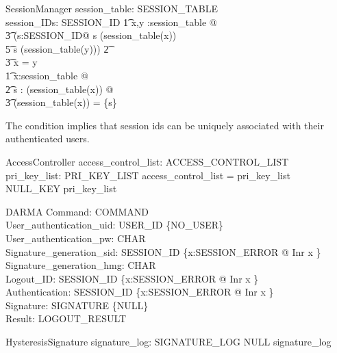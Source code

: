 \documentclass[a4paper,pdftex]{article}
\begin{document}
\begin{schema}{SessionManager}
  session\_table: SESSION\_TABLE \\
  session\_IDs: \finset SESSION\_ID
  \where
  \t1 \forall x,y :\dom session\_table @         \\
  \t3  (\exists s:SESSION\_ID@ s \in \dom (session\_table(x)) \\
  \t5                          \land s \in \dom (session\_table(y))) 
  \t2  \implies  \\
  \t3   x = y\\
  \t1 \forall  x:\dom session\_table @ \\
  \t2   \forall s : \dom (session\_table(x)) @ \\
  \t3               \dom (session\_table(x)) = \{s\}
\end{schema}

The condition implies that session ids can be uniquely associated with their
authenticated users.

\begin{schema}{AccessController}
  access\_control\_list: ACCESS\_CONTROL\_LIST \\
  pri\_key\_list: PRI\_KEY\_LIST
  \where
  \dom access\_control\_list = \dom pri\_key\_list \\
  NULL\_KEY \notin \ran pri\_key\_list
\end{schema}

\begin{schema}{DARMA}
  Command: COMMAND \\
  User\_authentication\_uid: USER\_ID \setminus \{NO\_USER\} \\
  User\_authentication\_pw: \seq CHAR \\
  Signature\_generation\_sid: SESSION\_ID \setminus \{x:SESSION\_ERROR @ Inr x \} \\
  Signature\_generation\_hmg: \seq CHAR \\
  Logout\_ID: SESSION\_ID \setminus \{x:SESSION\_ERROR @ Inr x \} \\
  Authentication: SESSION\_ID \setminus \{x:SESSION\_ERROR @ Inr x \} \\
  Signature: SIGNATURE \setminus \{NULL\} \\
  Result: LOGOUT\_RESULT
\end{schema}  

\begin{schema}{HysteresisSignature}
  signature\_log: SIGNATURE\_LOG
  \where
  NULL \notin \ran signature\_log
\end{schema}
\end{document}
